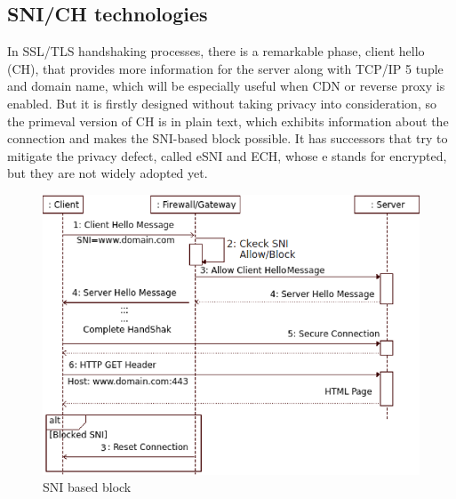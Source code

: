 \subsection{SNI/CH technologies}
\begin{frame}

    In SSL/TLS handshaking processes, there is a remarkable phase, client hello (CH), that provides more information for the server along with TCP/IP 5 tuple and domain name, which will be especially useful when CDN or reverse proxy is enabled.
    But it is firstly designed without taking privacy into consideration, so the primeval version of CH is in plain text, which exhibits information about the connection and makes the SNI-based block possible.
    It has successors that try to mitigate the privacy defect, called eSNI and ECH, whose e stands for encrypted, but they are not widely adopted yet.
    \begin{figure}
        \centering
        \includegraphics[scale=0.25]{pics/SNI_Block.png}
        \caption{\small SNI based block \cite{SNI_block}}
        \label{fig:fallback}
    \end{figure}
\end{frame}


